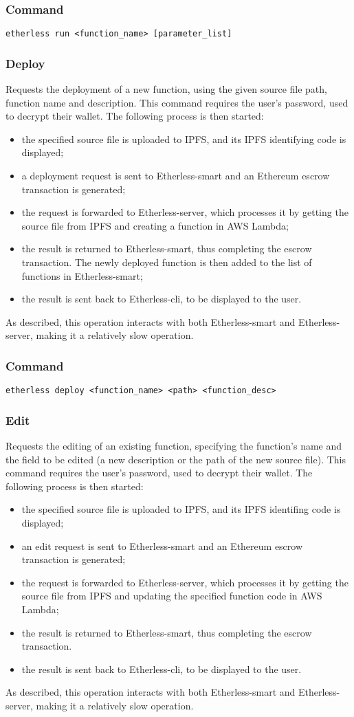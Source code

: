 	\subsubsection*{Command}
	\texttt{etherless run <function\_name> [parameter\_list]}
	\subsubsection{Deploy}
	Requests the deployment of a new function, using the given source file path, function name and description. This command requires the user's password, used to decrypt their wallet. The following process is then started:
	\begin{itemize}
		\item the specified source file is uploaded to IPFS, and its IPFS identifying code is displayed;
		\item a deployment request is sent to Etherless-smart and an Ethereum escrow transaction is generated;
		\item the request is forwarded to Etherless-server, which processes it by getting the source file from IPFS and creating a function in AWS Lambda;
		\item the result is returned to Etherless-smart, thus completing the escrow transaction. The newly deployed function is then added to the list of functions in Etherless-smart;
		\item the result is sent back to Etherless-cli, to be displayed to the user.
	\end{itemize}
	As described, this operation interacts with both Etherless-smart and Etherless-server, making it a relatively slow operation.
	\subsubsection*{Command}
	\texttt{etherless deploy <function\_name> <path> <function\_desc>}
	\subsubsection{Edit}
	Requests the editing of an existing function, specifying the function's name and the field to be edited (a new description or the path of the new source file). This command requires the user's password, used to decrypt their wallet. The following process is then started:
	\begin{itemize}
		\item the specified source file is uploaded to IPFS, and its IPFS identifing code is displayed;
		\item an edit request is sent to Etherless-smart and an Ethereum escrow transaction is generated;
		\item the request is forwarded to Etherless-server, which processes it by getting the source file from IPFS and updating the specified function code in AWS Lambda;
		\item the result is returned to Etherless-smart, thus completing the escrow transaction.
		\item the result is sent back to Etherless-cli, to be displayed to the user.
	\end{itemize}
	As described, this operation interacts with both Etherless-smart and Etherless-server, making it a relatively slow operation.
